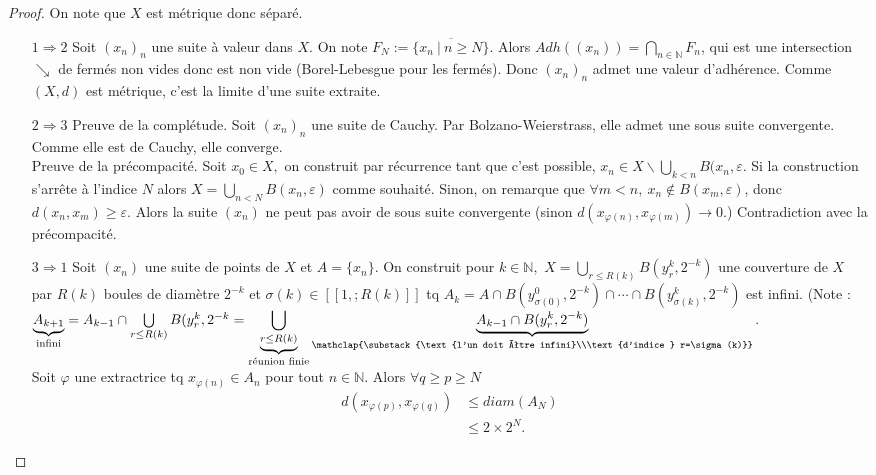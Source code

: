 \begin{proof}
    On note que $X$ est métrique donc séparé.
    \begin{itemize}
    \item[$1\Rightarrow 2$] Soit $(x_n)_n$ une suite à valeur dans $X$. On note $F_N:=\overline{\{x_n\ |\ n\ge N\}} $.
    Alors $Adh((x_n))=\bigcap\limits_{n\in \mathbb{N} } F_n$, qui est une intersection $\searrow$ de fermés non vides donc est non vide (Borel-Lebesgue pour les fermés). 
        Donc $(x_{n})_n$ admet une valeur d'adhérence. 
        Comme $(X,d)$ est métrique, c'est la limite d'une suite extraite.
    \item[ $2\Rightarrow 3$] Preuve de la complétude. Soit $(x_{n})_n$ une suite de Cauchy. Par Bolzano-Weierstrass, elle admet une sous suite convergente. Comme elle est de Cauchy, elle converge.\\
        Preuve de la précompacité. Soit $x_0\in X,$ on construit par récurrence tant que c'est possible, $x_{n}\in X\backslash \bigcup\limits_{k<n} B(x_{n},\varepsilon $. Si la construction s'arrête à l'indice $N$ alors $X=\bigcup\limits_{n<N} B(x_{n},\varepsilon )$ comme souhaité. Sinon, on remarque que $\forall m<n,\ x_{n}\not\in B(x_m,\varepsilon ) $, donc $d(x_{n},x_m)\ge \varepsilon .$ Alors la suite $(x_{n})$ ne peut pas avoir de sous suite convergente (sinon $d(x _{\varphi (n)},x_{\varphi (m)})\to 0.$) Contradiction avec la précompacité.
    \item[$3\Rightarrow 1$] Soit $(x_{n})$ une suite de points de $X$ et $A=\{x_{n}\} $.
    On construit pour  $k\in \mathbb{N} ,$ $X=\bigcup\limits_{r\le R(k)} B(y_r^k,2^{-k})$ une couverture de $X$ par $R(k)$ boules de diamètre $2^{-k}$ et $\sigma(k)\in [\![1,;R(k)]\!]$ tq $A_k=A\cap B(y^0_{\sigma(0)},2^{-k}) \cap \cdots\cap B(y^k_{\sigma(k)},2^{-k})$ est infini. 
    (Note : $\underbrace{A_{k+1}}_{\text{infini}}=A_{k-1}\cap \bigcup\limits_{r\le R(k)} B(y^k_r,2^{-k}=\underbrace{\bigcup\limits_{r\le R(k)}}_{\text{réunion finie}}\underbrace{A_{k-1}\cap B(y^k_r, 2^{-k})}_{\mathclap{\substack{\text{l'un doit être infini}\\\text{d'indice } r=\sigma(k)}}} $.\\
        Soit $\varphi $ une extractrice tq $x_{\varphi (n)}\in A_n$ pour tout $n\in \mathbb{N} .$ Alors $\forall q\ge p\ge N$
        \begin{align*}
            d(x_{\varphi (p)},x_{\varphi (q)}) &\le diam(A_N)\\
                                               &\le 2\times 2^N.
        \end{align*}

\end{itemize}
\end{proof}

